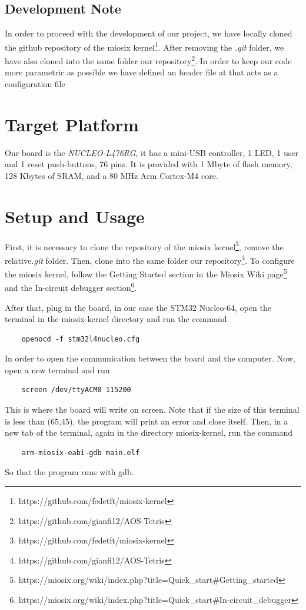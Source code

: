 \documentclass{article}
\begin{document}
\subsection{Development Note}
In order to proceed with the development of our project, we have locally cloned the github repository of the miosix kernel\footnote{https://github.com/fedetft/miosix-kernel}.
After removing the \emph{.git} folder, we have also cloned into the same folder our repository\footnote{https://github.com/gianfi12/AOS-Tetris}.
In order to keep our code more parametric as possible we have defined an header file at  that acts as a configuration file

\section{Target Platform}
Our board is the \emph{NUCLEO-L476RG}, it has a mini-USB controller, 1 LED, 1 user and 1 reset push-buttons, 76 pins.
It is provided with 1 Mbyte of flash memory, 128 Kbytes of SRAM, and a 80 MHz Arm Cortex-M4 core.

\section{Setup and Usage}
First, it is necessary to clone the repository of the miosix kernel\footnote{https://github.com/fedetft/miosix-kernel}, remove the relative\emph{.git} folder.\newline
Then, clone into the same folder our repository\footnote{https://github.com/gianfi12/AOS-Tetris}.\newline
To configure the miosix kernel, follow the Getting Started section in the Miosix Wiki page\footnote{https://miosix.org/wiki/index.php?title=Quick\_start\#Getting\_started} 
and the In-circuit debugger section\footnote{https://miosix.org/wiki/index.php?title=Quick\_start\#In-circuit\_debugger}.\newline

After that, plug in the board, in our case the STM32 Nucleo-64, open the terminal in the miosix-kernel directory and run the command
\begin{verbatim}
    openocd -f stm32l4nucleo.cfg
\end{verbatim}
In order to open the communication between the board and the computer.\newline
Now, open a new terminal and run
\begin{verbatim}
    screen /dev/ttyACM0 115200
\end{verbatim}
This is where the board will write on screen. Note that if the size of this terminal is less than (65,45), the program will print an error and close itself.
Then, in a new tab of the terminal, again in the directory miosix-kernel, run the command
\begin{verbatim}
    arm-miosix-eabi-gdb main.elf
\end{verbatim}
So that the program runs with gdb.
\end{document}
